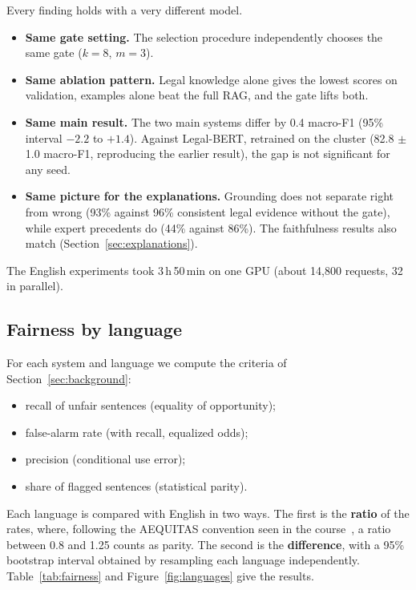 Every finding holds with a very different model.
\begin{itemize}
  \item \textbf{Same gate setting.} The selection procedure independently chooses the same gate ($k=8$, $m=3$).
  \item \textbf{Same ablation pattern.} Legal knowledge alone gives the lowest scores on validation, examples alone beat the full RAG, and the gate lifts both.
  \item \textbf{Same main result.} The two main systems differ by 0.4 macro-F1 (95\% interval $-2.2$ to $+1.4$). Against Legal-BERT, retrained on the cluster (82.8 $\pm$ 1.0 macro-F1, reproducing the earlier result), the gap is not significant for any seed.
  \item \textbf{Same picture for the explanations.} Grounding does not separate right from wrong (93\% against 96\% consistent legal evidence without the gate), while expert precedents do (44\% against 86\%). The faithfulness results also match (Section~\ref{sec:explanations}).
\end{itemize}
The English experiments took 3\,h\,50\,min on one GPU (about 14,800 requests, 32 in parallel).

\subsection{Fairness by language}

For each system and language we compute the criteria of Section~\ref{sec:background}:
\begin{itemize}
  \item recall of unfair sentences (equality of opportunity);
  \item false-alarm rate (with recall, equalized odds);
  \item precision (conditional use error);
  \item share of flagged sentences (statistical parity).
\end{itemize}
Each language is compared with English in two ways. The first is the \textbf{ratio} of the rates, where, following the AEQUITAS convention seen in the course~\citep{slides_aequitas}, a ratio between 0.8 and 1.25 counts as parity. The second is the \textbf{difference}, with a 95\% bootstrap interval obtained by resampling each language independently. Table~\ref{tab:fairness} and Figure~\ref{fig:languages} give the results.

